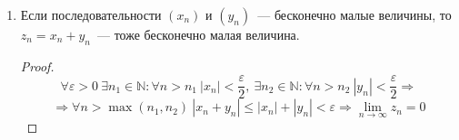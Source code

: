 \begin{enumerate}
	\item Если последовательности $(x_n)$ и $(y_n)$~--- бесконечно малые величины, то $z_n = x_n + y_n$~--- тоже бесконечно малая величина.
	\begin{proof}
	\begin{equation*}
	\forall \varepsilon > 0 \
	\exists n_1 \in \mathbb N \colon \forall n > n_1 \ |x_n| < \frac\varepsilon2, \
	\exists n_2 \in \mathbb N \colon \forall n > n_2 \ |y_n| < \frac\varepsilon2 \Rightarrow
	\end{equation*}
	\begin{equation*}
	\Rightarrow \forall n > \max(n_1, n_2) \ |x_n + y_n| \leqslant |x_n| + |y_n| < \varepsilon \Rightarrow
	\lim_{n \to \infty} z_n = 0
	\end{equation*}
	\end{proof}
\end{enumerate}